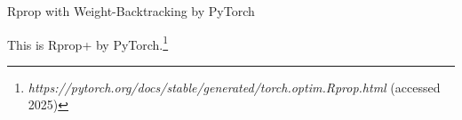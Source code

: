 \begin{subsection}{Rprop with Weight-Backtracking by PyTorch}
    \par This is Rprop+ by PyTorch.\footnote{\textit{https://pytorch.org/docs/stable/generated/torch.optim.Rprop.html} (accessed 2025)}
\end{subsection}